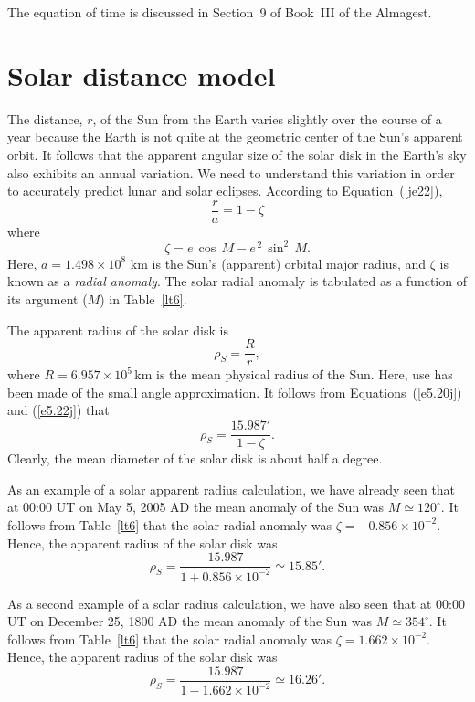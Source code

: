The equation of time is discussed in Section~9 of Book~III of the Almagest. 

\section{Solar distance model}
The distance, $r$,  of the Sun from the Earth varies slightly over the course of a year because the Earth is not quite at the geometric center of the Sun's apparent orbit. 
It follows that the apparent angular size of the solar disk in the Earth's sky also exhibits an annual variation. We need to understand this variation in order to
accurately predict lunar and solar eclipses. 
According to Equation~(\ref{je22}), 
\begin{equation}\label{e5.20j}
\frac{r}{a} = 1 -\zeta
\end{equation}
where
\begin{equation}
\zeta = e\,\cos\,M -e^{\,2}\,\sin^2\,M.
\end{equation}
Here, $a=1.498\times 10^8$ km is the Sun's (apparent) orbital major radius, and $\zeta$ is known as a {\em radial anomaly}. The solar radial anomaly
is tabulated as a function of its argument ($M$) in Table~\ref{lt6}. 

The apparent radius of the solar disk is
\begin{equation}\label{e5.22j}
\rho_S = \frac{R}{r},
\end{equation}
where $R= 6.957\times 10^5$\,km is the mean physical radius of the Sun. Here, use has been made of the small angle approximation.
It follows  from Equations~(\ref{e5.20j}) and (\ref{e5.22j}) that
\begin{equation}\label{rhos}
\rho_S = \frac{15.987'}{1-\zeta}.
\end{equation}
Clearly, the mean diameter of the solar disk is about half a degree. 

As an example of a solar apparent radius calculation, we have already seen that at 00:00 UT on May 5, 2005 AD the  mean anomaly of the Sun was
$M\simeq 120^\circ$. It follows from Table~\ref{lt6} that the solar radial anomaly was $\zeta=-0.856\times 10^{-2}$. Hence, the
apparent radius of the solar disk was
\begin{equation}
\rho_S = \frac{15.987}{1+0.856\times 10^{-2}}\simeq 15.85'.
\end{equation}

As a second example of a solar radius calculation, we have also seen that at 00:00 UT on December 25, 1800 AD the mean anomaly
of the Sun was $M\simeq 354^\circ$. It follows from Table~\ref{lt6} that the solar radial anomaly was $\zeta=1.662\times 10^{-2}$. 
Hence, the
apparent radius of the solar disk was
\begin{equation}
\rho_S = \frac{15.987}{1-1.662\times 10^{-2}}\simeq 16.26'.
\end{equation}

